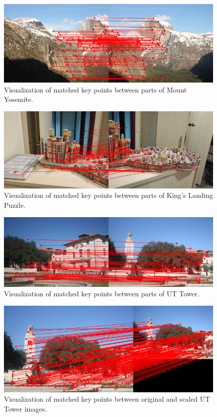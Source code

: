 \documentclass{article}
\begin{document}
\begin{figure}[!htb]
  \centering
  \includegraphics[width=.99\textwidth]{yosemite1_2_match.png}
  \caption{Visualization of matched key points between parts of Mount Yosemite.}
\end{figure}%
\begin{figure}[!htb]
  \centering
  \includegraphics[width=.99\textwidth]{got1_2_match.png}
  \caption{Visualization of matched key points between parts of King's Landing Puzzle.}
\end{figure}%
\newpage
\begin{figure}[!htb]
  \centering
  \includegraphics[width=.99\textwidth]{uttower1_2_match.png}
  \caption{Visualization of matched key points between parts of UT Tower.}
\end{figure}%
\begin{figure}[!htb]
  \centering
  \includegraphics[width=.99\textwidth]{uttower2_2scaled_match.png}
  \caption{Visualization of matched key points between original and scaled UT Tower images.}
\end{figure}%
\end{document}
